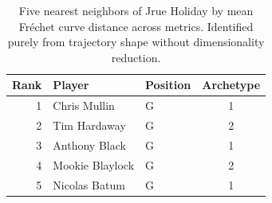 \begin{table}[htbp]
  \centering\small
  \begin{tabular}{rllc}
    \toprule
    Rank & Player & Position & Archetype \\
    \midrule
    1 & Chris Mullin & G & 1 \\
    2 & Tim Hardaway & G & 2 \\
    3 & Anthony Black & G & 1 \\
    4 & Mookie Blaylock & G & 2 \\
    5 & Nicolas Batum & G & 1 \\
    \bottomrule
  \end{tabular}
  \caption{Five nearest neighbors of Jrue Holiday by mean Fr\'{e}chet curve distance across metrics. Identified purely from trajectory shape without dimensionality reduction.}
  \label{tab:Jrue_Holiday_frechet_curve_neighbors}
\end{table}

